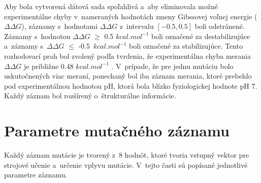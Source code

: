 Aby bola vytvorená dátová sada spoľahlivá a~aby eliminovala možné experimentálne chyby v~nameraných hodnotách zmeny Gibssovej voľnej energie ($\Delta\Delta G$), záznamy s~hodnotami $\Delta\Delta G$ z~intervalu $\left[-0.5,0.5\right]$ boli odstránené. Záznamy s~hodnotou $\Delta\Delta G$ $\geq$ 0.5 $kcal.mol^{-1}$ boli označené za destabilizujúce a~záznamy s~$\Delta\Delta G$ $\leq$ -0.5~$kcal.mol^{-1}$ boli označené za stabilizujúce. Tento rozhodovací prah bol zvolený podľa tvrdenia, že experimentálna chyba merania $\Delta\Delta G$ je približne 0.48 $kcal.mol^{-1}$ \cite{threshold}.
V~prípade, že pre jednu mutáciu bolo uskutočnených viac meraní, ponechaný bol iba záznam merania, ktoré prebehlo pod experimentálnou hodnotou pH, ktorá bola blízko fyziologickej hodnote pH 7. Každý záznam bol rozšírený o~štrukturálne informácie.

\section{Parametre mutačného záznamu}

Každý záznam mutácie je tvorený z~8 hodnôt, ktoré tvoria vstupný vektor pre strojové učenie a~určenie vplyvu mutácie. V~tejto časti sú popísané jednotlivé parametre záznamu.

